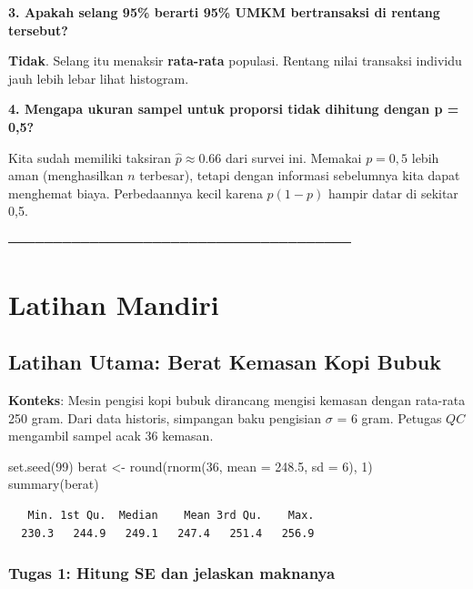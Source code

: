\documentclass[
  indonesian,
  letterpaper,
]{book}
\newenvironment{Shaded}{\begin{snugshade}}{\end{snugshade}}
\newcommand{\AttributeTok}[1]{\textcolor[rgb]{0.40,0.45,0.13}{#1}}
\newcommand{\DecValTok}[1]{\textcolor[rgb]{0.68,0.00,0.00}{#1}}
\newcommand{\FloatTok}[1]{\textcolor[rgb]{0.68,0.00,0.00}{#1}}
\newcommand{\FunctionTok}[1]{\textcolor[rgb]{0.28,0.35,0.67}{#1}}
\newcommand{\NormalTok}[1]{\textcolor[rgb]{0.00,0.23,0.31}{#1}}
\newcommand{\OtherTok}[1]{\textcolor[rgb]{0.00,0.23,0.31}{#1}}
\begin{document}
\textbf{3. Apakah selang 95\% berarti 95\% UMKM bertransaksi di rentang
tersebut?}

\textbf{Tidak}. Selang itu menaksir \textbf{rata-rata} populasi. Rentang
nilai transaksi individu jauh lebih lebar lihat histogram.

\textbf{4. Mengapa ukuran sampel untuk proporsi tidak dihitung dengan p
= 0,5?}

Kita sudah memiliki taksiran \(\hat{p} \approx 0.66\) dari survei ini.
Memakai \(p = 0{,}5\) lebih aman (menghasilkan \(n\) terbesar), tetapi
dengan informasi sebelumnya kita dapat menghemat biaya. Perbedaannya
kecil karena \(p(1-p)\) hampir datar di sekitar 0,5.

──────────────────────────────────────

\section{Latihan Mandiri}\label{latihan-mandiri}

\subsection{Latihan Utama: Berat Kemasan Kopi
Bubuk}\label{latihan-utama-berat-kemasan-kopi-bubuk}

\textbf{Konteks}: Mesin pengisi kopi bubuk dirancang mengisi kemasan
dengan rata-rata 250 gram. Dari data historis, simpangan baku pengisian
\(\sigma\) = 6 gram. Petugas \(QC\) mengambil sampel acak 36 kemasan.

\begin{Shaded}
\begin{Highlighting}[]
\FunctionTok{set.seed}\NormalTok{(}\DecValTok{99}\NormalTok{)}
\NormalTok{berat }\OtherTok{\textless{}{-}} \FunctionTok{round}\NormalTok{(}\FunctionTok{rnorm}\NormalTok{(}\DecValTok{36}\NormalTok{, }\AttributeTok{mean =} \FloatTok{248.5}\NormalTok{, }\AttributeTok{sd =} \DecValTok{6}\NormalTok{), }\DecValTok{1}\NormalTok{)}
\FunctionTok{summary}\NormalTok{(berat)}
\end{Highlighting}
\end{Shaded}

\begin{verbatim}
   Min. 1st Qu.  Median    Mean 3rd Qu.    Max. 
  230.3   244.9   249.1   247.4   251.4   256.9 
\end{verbatim}

\subsubsection{Tugas 1: Hitung SE dan jelaskan
maknanya}\label{tugas-1-hitung-se-dan-jelaskan-maknanya}
\end{document}
